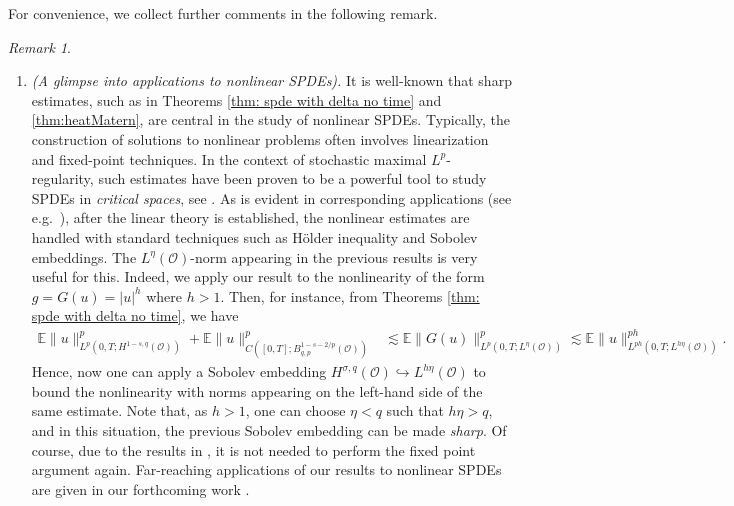 \documentclass[reqno]{amsart}
\theoremstyle{plain}
\theoremstyle{remark}
\newtheorem{remark}[theorem]{Remark}
\theoremstyle{plain}
\numberwithin{equation}{section}
\newcommand\cO{\mathcal{O}}
\newcommand{\E}{{\mathbb E}}
\newcommand{\1}{\one}
\newcommand{\embed}{\hookrightarrow}
\begin{document}
For convenience, we collect further comments in the following remark.
\begin{remark}\
\label{rem:generalization_SPDE}
\begin{enumerate}[\rm (1)] 
 \item \emph{(A glimpse into applications to nonlinear SPDEs).}
 It is well-known that sharp estimates, such as in Theorems \ref{thm: spde with delta no time} and \ref{thm:heatMatern}, are central in the study of nonlinear SPDEs. Typically, the construction of solutions to nonlinear problems often involves linearization and fixed-point techniques. In the context of stochastic maximal $L^p$-regularity, such estimates have been proven to be a powerful tool to study SPDEs in \emph{critical spaces}, see \cite{AV25_survey}.
 As is evident in corresponding applications (see e.g.\ \cite{AVreaction-local,AV20_NS}), after the linear theory is established, the nonlinear estimates are handled with standard techniques such as H\"older inequality and Sobolev embeddings. 
 The $L^\eta(\cO)$-norm appearing in the previous results is very useful for this. Indeed, we apply our result to the nonlinearity of the form $g=G(u)=|u|^h$ where $h>1$. Then, for instance, from Theorems \ref{thm: spde with delta no time}, we have 
\begin{align}
    \E\|u\|_{L^p(0,T;H^{1-s,q}(\cO))}^p
    +\E\|u\|_{C([0,T];B^{1-s-2/p}_{q,p}(\cO))}^p
    &\lesssim
    \E\|G(u)\|_{L^p(0,T;L^\eta(\cO))}^p\lesssim \E\|u\|_{L^{ph}(0,T;L^{h\eta}(\cO))}^{ph}.
\end{align}
Hence, now one can apply a Sobolev embedding $H^{\sigma,q}(\cO)\embed L^{h \eta}(\cO)$ to bound the nonlinearity with norms appearing on the left-hand side of the same estimate.
Note that, as $h>1$, one can choose $\eta<q$ such that $h\eta>q$, and in this situation, the previous Sobolev embedding can be made \emph{sharp}. 
%
Of course, due to the results in \cite{AV19_QSEE_1,AV19_QSEE_2,AV25_survey}, it is not needed to perform the fixed point argument again. Far-reaching applications of our results to nonlinear SPDEs are given in our forthcoming work \cite{AGVlocal}.


\end{enumerate}
\end{remark}
\end{document}
